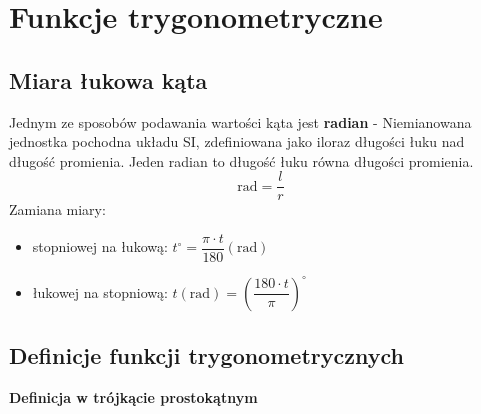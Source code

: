 \documentclass[14pt,a4paper]{extarticle}
\begin{document}
\newpage

\section{Funkcje trygonometryczne}
\subsection{Miara łukowa kąta}
\noindent Jednym ze sposobów podawania wartości kąta jest \textbf{radian} - Niemianowana jednostka
pochodna układu SI, zdefiniowana jako iloraz długości łuku nad długość promienia. Jeden radian to
długość łuku równa długości promienia.\\
$$\text{rad} = \dfrac{l}{r}$$\hfill\break
Zamiana miary:
\begin{itemize}
   \item stopniowej na łukową: $t^{\circ } = \dfrac{\pi \cdot t}{180} (\text{rad})$
   \item łukowej na stopniową: $t(\text{rad}) = \left(\dfrac{180 \cdot t}{\pi}\right)^{\circ}$
\end{itemize}
\subsection{Definicje funkcji trygonometrycznych}
\noindent\textbf{Definicja w trójkącie prostokątnym}
\end{document}
